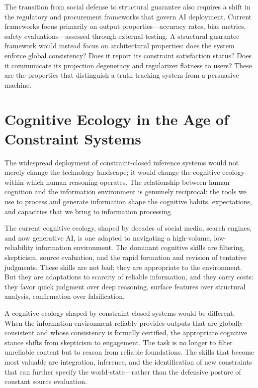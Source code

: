 \documentclass[11pt, oneside]{article}
\begin{document}
The transition from social defense to structural guarantee also requires a shift in the regulatory and procurement frameworks that govern AI deployment. Current frameworks focus primarily on output properties---accuracy rates, bias metrics, safety evaluations---assessed through external testing. A structural guarantee framework would instead focus on architectural properties: does the system enforce global consistency? Does it report its constraint satisfaction status? Does it communicate its projection degeneracy and regularizer flatness to users? These are the properties that distinguish a truth-tracking system from a persuasive machine.

\section{Cognitive Ecology in the Age of Constraint Systems}

The widespread deployment of constraint-closed inference systems would not merely change the technology landscape; it would change the cognitive ecology within which human reasoning operates. The relationship between human cognition and the information environment is genuinely reciprocal: the tools we use to process and generate information shape the cognitive habits, expectations, and capacities that we bring to information processing.

The current cognitive ecology, shaped by decades of social media, search engines, and now generative AI, is one adapted to navigating a high-volume, low-reliability information environment. The dominant cognitive skills are filtering, skepticism, source evaluation, and the rapid formation and revision of tentative judgments. These skills are not bad; they are appropriate to the environment. But they are adaptations to scarcity of reliable information, and they carry costs: they favor quick judgment over deep reasoning, surface features over structural analysis, confirmation over falsification.

A cognitive ecology shaped by constraint-closed systems would be different. When the information environment reliably provides outputs that are globally consistent and whose consistency is formally certified, the appropriate cognitive stance shifts from skepticism to engagement. The task is no longer to filter unreliable content but to reason from reliable foundations. The skills that become most valuable are integration, inference, and the identification of new constraints that can further specify the world-state---rather than the defensive posture of constant source evaluation.
\end{document}
